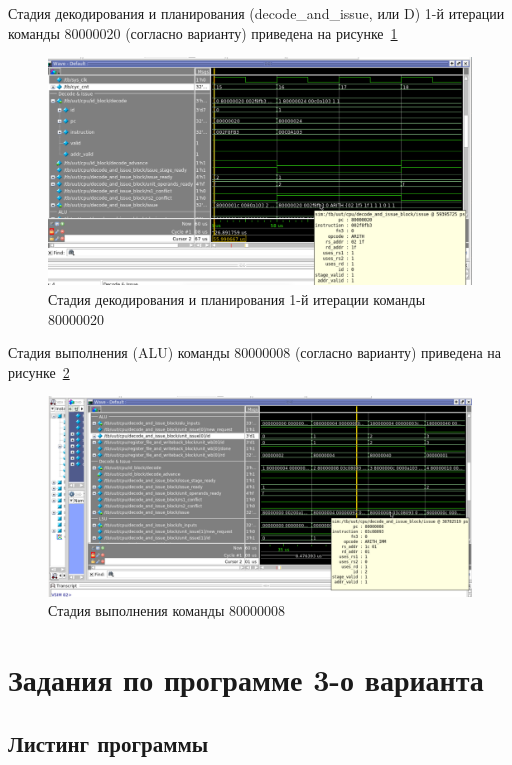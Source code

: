 Стадия декодирования и планирования (decode\_and\_issue, или D) 1-й итерации команды 80000020 (согласно варианту) приведена на рисунке~\ref{img:task3}

\begin{figure}[H]
	\centering
	\includegraphics[width=1\textwidth]{images/task3.png}
	\caption{Стадия декодирования и планирования 1-й итерации команды 80000020}
	\label{img:task3}
\end{figure}
\clearpage

Стадия выполнения (ALU) команды 80000008 (согласно варианту) приведена на рисунке~\ref{img:task4}

\begin{figure}[H]
	\centering
	\includegraphics[width=1\textwidth]{images/task4.png}
	\caption{Стадия выполнения команды 80000008}
	\label{img:task4}
\end{figure}
\clearpage

\section{Задания по программе 3-о варианта}

\subsection{Листинг программы}

